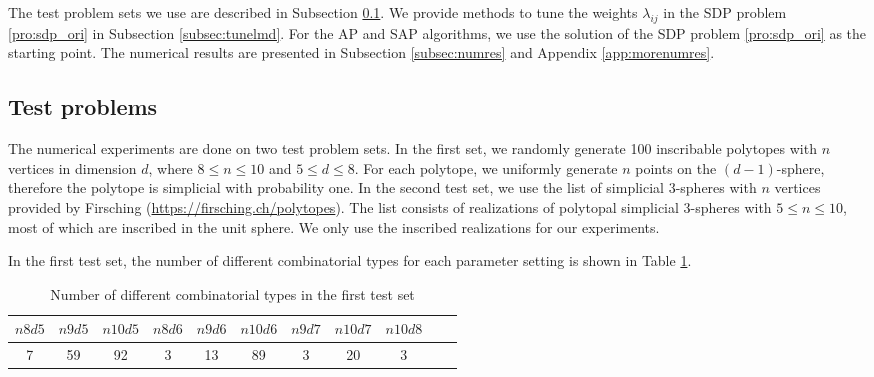 \documentclass[smallextended, envcountsame]{svjour3}
\begin{document}
    The test problem sets we use are described in Subsection \ref{subsec:testsets}.  We provide methods to tune the weights $\lambda_{ij}$ in the SDP problem \eqref{pro:sdp_ori} in Subsection \ref{subsec:tunelmd}.  For the AP and SAP algorithms, we use the solution of the SDP problem \eqref{pro:sdp_ori} as the starting point.  The numerical results are presented in Subsection \ref{subsec:numres} and Appendix \ref{app:morenumres}.
    

\subsection{Test problems}\label{subsec:testsets}
    The numerical experiments are done on two test problem sets. In the first set, we randomly generate 100 inscribable polytopes with $n$ vertices in dimension $d$, where $8\le n\le 10$ and $5\le d\le 8$.  For each polytope, we uniformly generate $n$ points on the $(d-1)$-sphere, therefore the polytope is simplicial with probability one.  In the second test set, we use the list of simplicial 3-spheres with $n$ vertices provided by Firsching \cite{firsching2017realizability} (\url{https://firsching.ch/polytopes}).  The list consists of realizations of polytopal simplicial 3-spheres with $5\le n\le 10$, most of which are inscribed in the unit sphere. We only use the inscribed realizations for our experiments.

    In the first test set, the number of different combinatorial types for each parameter setting is shown in Table \ref{tab:numcombtype}.
    \begin{table}[!htb]
    \caption{Number of different combinatorial types in the first test set}
    \label{tab:numcombtype}
    \centering
    \begin{tabular}{ccccccccccc}
    \hline
    $n8d5$ & $n9d5$ & $n10d5$ & $n8d6$ & $n9d6$ & $n10d6$ & $n9d7$ & $n10d7$ & $n10d8$\\ \hline
    7 & 59 & 92 & 3 & 13 & 89 & 3 & 20 & 3\\
    \hline
    \end{tabular}
    \end{table}\FloatBarrier
    
\end{document}
